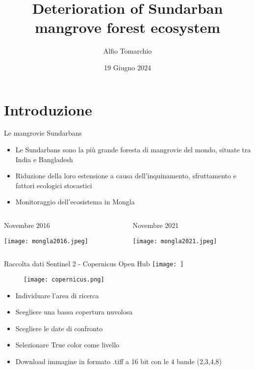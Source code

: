 \documentclass{beamer} %
\title{Deterioration of Sundarban mangrove forest ecosystem}
\author{Alfio Tomarchio}
\date{19 Giugno 2024}
\begin{document}
\maketitle


\section{Introduzione}

        \begin{frame}{Le mangrovie Sundarbans}
            \begin{itemize}
                \item Le Sundarbans sono la più grande foresta di mangrovie del mondo, situate tra India e Bangladesh
                \item Riduzione della loro estensione a causa dell'inquinamento, sfruttamento e fattori ecologici stocastici
                \item Monitoraggio dell'ecosistema in Mongla
\end{itemize}
\begin{columns}
\begin{column}{0.5\textwidth}
\begin{center}
\caption{Novembre 2016}
\bigskip
  \texttt{[image: mongla2016.jpeg]}
    \end{center}
\end{column}
\begin{column}{0.5\textwidth}  
\begin{center}
\caption{Novembre 2021}
\bigskip
\texttt{[image: mongla2021.jpeg]}
\end{center}
\end{column}
\end{columns}

  \end{frame} 


  
        \begin{frame}{Raccolta dati}
Sentinel 2 - Copernicus Open Hub \texttt{[image: ]}
\begin{wrapfigure}{r}{0.25\textwidth} %
    \centering
    \texttt{[image: copernicus.png]}
\end{wrapfigure}
\bigskip
\begin{itemize}
    \item Individuare l'area di ricerca
    \item Scegliere una bassa copertura nuvolosa 
    \item Scegliere le date di confronto
    \item Selezionare True color come livello
    \item Download immagine in formato .tiff a 16 bit con le 4 bande (2,3,4,8)
\end{itemize}
 \end{frame}
\end{document}

